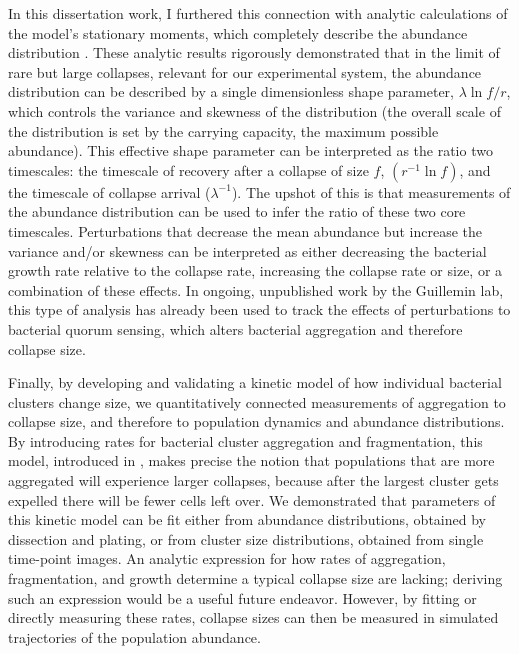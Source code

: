 In this dissertation work, I furthered this connection with analytic calculations of the model's stationary moments, which completely describe the abundance distribution \cite{schlomann2018stationary}. These analytic results rigorously demonstrated that in the limit of rare but large collapses, relevant for our experimental system, the abundance distribution can be described by a single dimensionless shape parameter, $\lambda\ln f/r$, which controls the variance and skewness of the distribution (the overall scale of the distribution is set by the carrying capacity, the maximum possible abundance).  This effective shape parameter can be interpreted as the ratio two timescales: the timescale of recovery after a collapse of size $f$, $(r^{-1}\ln f)$, and the timescale of collapse arrival ($\lambda^{-1}$). The upshot of this is that measurements of the abundance distribution can be used to infer the ratio of these two core timescales. Perturbations that decrease the mean abundance but increase the variance and/or skewness can be interpreted as either decreasing the bacterial growth rate relative to the collapse rate, increasing the collapse rate or size, or a combination of these effects. In ongoing, unpublished work by the Guillemin lab, this type of analysis has already been used to track the effects of perturbations to bacterial quorum sensing, which alters bacterial aggregation and therefore collapse size. 

Finally, by developing and validating a kinetic model of how individual bacterial clusters change size, we quantitatively connected measurements of aggregation to collapse size, and therefore to population dynamics and abundance distributions. By introducing rates for bacterial cluster aggregation and fragmentation, this model, introduced in \cite{schlomann_sublethal_2019}, makes precise the notion that populations that are more aggregated will experience larger collapses, because after the largest cluster gets expelled there will be fewer cells left over. We demonstrated that parameters of this kinetic model can be fit either from abundance distributions, obtained by dissection and plating, or from cluster size distributions, obtained from single time-point images. An analytic expression for how rates of aggregation, fragmentation, and growth determine a typical collapse size are lacking; deriving such an expression would be a useful future endeavor. However, by fitting or directly measuring these rates, collapse sizes can then be measured in simulated trajectories of the population abundance. 

